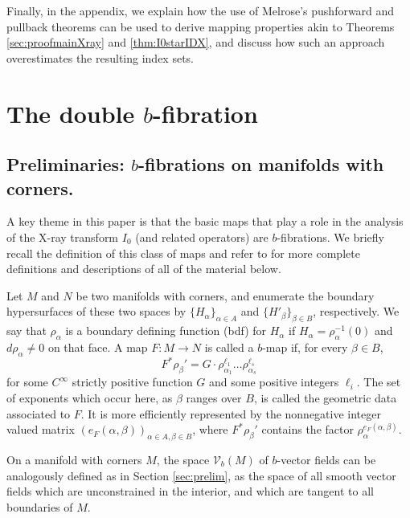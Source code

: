 \documentclass[11pt]{article}
\theoremstyle{plain}
\theoremstyle{definition}
\theoremstyle{remark}
\begin{document}
Finally, in the appendix, we explain how the use of Melrose's pushforward and pullback theorems can be used to derive mapping properties akin to Theorems \ref{sec:proofmainXray} and \ref{thm:I0starIDX}, and discuss how such an approach overestimates the resulting index sets.

\section{The double \texorpdfstring{$b$}{b}-fibration} \label{sec:doubleb}

\subsection{Preliminaries: $b$-fibrations on manifolds with corners.} \label{sec:bfib}

A key theme in this paper is that the basic maps that play a role in the analysis of the X-ray transform $I_0$
(and related operators) are $b$-fibrations. We briefly recall the definition of this class of maps and refer to
\cite{Grieser2001,Melrose1992, Mazzeo1991} for more complete definitions and descriptions of all of the material below.

Let $M$ and $N$ be two manifolds with corners, and enumerate the boundary hypersurfaces of these two spaces by $\{H_\alpha\}_{\alpha \in A}$
and $\{H'_\beta\}_{\beta \in B}$, respectively. We say that $\rho_\alpha$ is a boundary defining function (bdf) for $H_\alpha$ if
$H_\alpha = \rho_\alpha^{-1}(0)$ and $d\rho_\alpha \neq 0$ on that face. A map $F: M \to N$ is called a $b$-map if, for every $\beta \in B$,
\[
F^* \rho_\beta' = G \cdot \rho_{\alpha_1}^{\ell_1} \ldots \rho_{\alpha_s}^{\ell_s}
\]
for some $C^\infty$ strictly positive function $G$ and some positive integers $\ell_i$. The set of exponents which occur here,
as $\beta$ ranges over $B$, is called the geometric data associated to $F$. It is more efficiently represented by the nonnegative
integer valued matrix $(e_F(\alpha, \beta))_{\alpha\in A, \beta\in B}$, where $F^*\rho_\beta'$ contains the factor $\rho_\alpha^{e_F(\alpha, \beta)}$.

On a manifold with corners $M$, the space $\mathcal V_b(M)$ of $b$-vector fields can be analogously defined as in Section \ref{sec:prelim}, as the space of all smooth vector fields which are unconstrained in the interior, and which are tangent to all boundaries of $M$.
\end{document}
